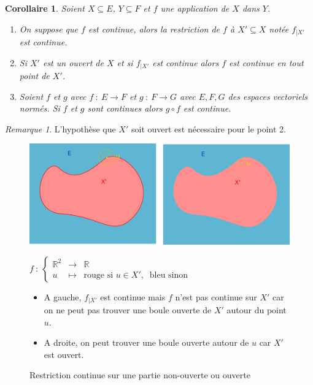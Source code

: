 \documentclass[]{article}
\newtheorem{mycor}{Corollaire}
\theoremstyle{remark}
\newtheorem{myrem}{Remarque}
\theoremstyle{definition}
\newcommand{\func}[5]{
#1 ~ : ~ \left\{ \begin{array}{lcl}
	#2 & \longrightarrow & #3 \\
	#4 & \longmapsto & #5
\end{array}
\right.
}
\newcommand{\funcshort}[3]{
#1 ~ : ~ #2 \longrightarrow #3
}
\begin{document}
\begin{mycor}
	Soient $X \subseteq E$, $Y \subseteq F$ et $f$ une application de $X$ dans $Y$.
	\begin{enumerate}
		\item On suppose que $f$ est continue, alors la restriction de $f$ à $X' \subseteq X$ notée $f_{|X'}$ est continue.
		
		\item Si $X'$ est un ouvert de $X$ et si $f_{|X'}$ est continue alors $f$ est continue en tout point de $X'$.
		
		\item Soient $f$ et $g$  avec $\funcshort{f}{E}{F}$ et $\funcshort{g}{F}{G}$ avec $E, F, G$ des espaces vectoriels normés. Si $f$ et $g$ sont continues alors $g \circ f$ est continue.
	\end{enumerate}
\end{mycor}

\begin{myrem}
	L'hypothèse que $X'$ soit ouvert est nécessaire pour le point 2.
	\begin{figure}[h!]
		\centering
		\includegraphics[width=550pt]{Application_continue}
		\caption{Restriction continue sur une partie non-ouverte ou ouverte}
		
		$\func{f}{\mathbb{R}^2}{\mathbb{R}}{u}{\text{rouge si } u \in X', ~ \text{ bleu sinon}}$
		
		\begin{itemize}
		\item A gauche, $f_{|X'}$ est continue mais $f$ n'est pas continue sur $X'$ car on ne peut pas trouver une boule ouverte de $X'$ autour du point $u$.
		
		\item A droite, on peut trouver une boule ouverte autour de $u$ car $X'$ est ouvert.
		\end{itemize}
	\end{figure}
\end{myrem}
\end{document}
